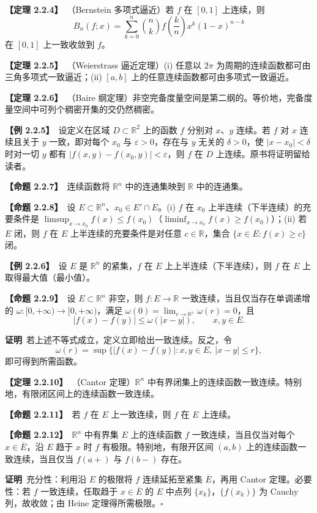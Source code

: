 \documentclass[UTF8,a4paper,11pt]{ctexart}
\newcommand{\ex}[1]{\par\medskip\noindent\textbf{【例 #1】}\ }
\newcommand{\prop}[1]{\par\medskip\noindent\textbf{【命题 #1】}\ }
\newcommand{\thm}[1]{\par\medskip\noindent\textbf{【定理 #1】}\ }
\newcommand{\pf}{\par\noindent\textbf{证明}\ }
\begin{document}
\thm{2.2.4}（Bernstein 多项式逼近）若 $f$ 在 $[0,1]$ 上连续，则
\[
B_n(f;x)=\sum_{k=0}^{n}\binom nk f\!\left(\frac kn\right)x^k(1-x)^{n-k}
\]
在 $[0,1]$ 上一致收敛到 $f$。

\thm{2.2.5}（Weierstrass 逼近定理）(i) 任意以 $2\pi$ 为周期的连续函数都可由三角多项式一致逼近；(ii) $[a,b]$ 上的任意连续函数都可由多项式一致逼近。

\thm{2.2.6}（Baire 纲定理）非空完备度量空间是第二纲的。等价地，完备度量空间中可列个稠密开集的交仍然稠密。



\ex{2.2.5}设定义在区域 $D\subset\mathbb R^2$ 上的函数 $f$ 分别对 $x$、$y$ 连续。若 $f$ 对 $x$ 连续且关于 $y$ 一致，即对每个 $x_0$ 与 $\varepsilon>0$，存在与 $y$ 无关的 $\delta>0$，使 $|x-x_0|<\delta$ 时对一切 $y$ 都有 $|f(x,y)-f(x_0,y)|<\varepsilon$，则 $f$ 在 $D$ 上连续。原书将证明留给读者。

\prop{2.2.7}连续函数将 $\mathbb R^n$ 中的连通集映到 $\mathbb R$ 中的连通集。

\prop{2.2.8}设 $E\subset\mathbb R^n$、$x_0\in E'\cap E$。(i) $f$ 在 $x_0$ 上半连续（下半连续）的充要条件是 $\limsup_{x\to x_0}f(x)\le f(x_0)$（$\liminf_{x\to x_0}f(x)\ge f(x_0)$）；(ii) 若 $E$ 闭，则 $f$ 在 $E$ 上半连续的充要条件是对任意 $c\in\mathbb R$，集合 $\{x\in E:f(x)\ge c\}$ 闭。

\ex{2.2.6}设 $E$ 是 $\mathbb R^n$ 的紧集，$f$ 在 $E$ 上上半连续（下半连续），则 $f$ 在 $E$ 上取得最大值（最小值）。

\prop{2.2.9}设 $E\subset\mathbb R^n$ 非空，则 $f:E\to\mathbb R$ 一致连续，当且仅当存在单调递增的 $\omega:[0,+\infty)\to[0,+\infty)$，满足 $\omega(0)=\lim_{r\to0^+}\omega(r)=0$，且
\[
|f(x)-f(y)|\le\omega(|x-y|),\qquad x,y\in E.
\]
\pf 若上述不等式成立，定义立即给出一致连续。反之，令
\[
\omega(r)=\sup\{|f(x)-f(y)|:x,y\in E,\ |x-y|\le r\},
\]
即可得到所需函数。

\thm{2.2.10}（Cantor 定理）$\mathbb R^n$ 中有界闭集上的连续函数一致连续。特别地，有限闭区间上的连续函数一致连续。

\prop{2.2.11}若 $f$ 在 $E$ 上一致连续，则 $f$ 在 $E$ 上连续。

\prop{2.2.12}$\mathbb R^n$ 中有界集 $E$ 上的连续函数 $f$ 一致连续，当且仅当对每个 $x\in\overline E$，沿 $E$ 趋于 $x$ 时 $f$ 有极限。特别地，有限开区间 $(a,b)$ 上的连续函数一致连续，当且仅当 $f(a+)$ 与 $f(b-)$ 存在。
\pf 充分性：利用沿 $E$ 的极限将 $f$ 连续延拓至紧集 $\overline E$，再用 Cantor 定理。必要性：若 $f$ 一致连续，任取趋于 $x\in\overline E$ 的 $E$ 中点列 $\{x_k\}$，$\{f(x_k)\}$ 为 Cauchy 列，故收敛；由 Heine 定理得所需极限。\hfill$\square$
\end{document}
